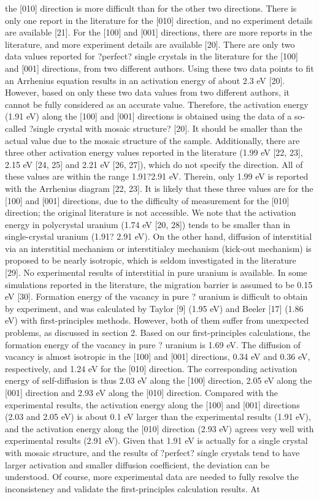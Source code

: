 \documentclass[review]{elsarticle}
\begin{document}
the [010] direction is more difficult than for the other two directions. There is only one report in the literature for the [010] direction, and no experiment details are available [21]. For the [100] and [001] directions, there are more reports in the literature, and more experiment details are available [20]. There are only two data values reported for ?perfect? single crystals in the literature for the [100] and [001] directions, from two different authors. Using these two data points to fit an Arrhenius equation results in an activation energy of about 2.3 eV [20]. However, based on only these two data values from two different authors, it cannot be fully considered as an accurate value. Therefore, the activation energy (1.91 eV) along the [100] and [001] directions is obtained using the data of a so-called ?single crystal with mosaic structure? [20]. It should be smaller than the actual value due to the mosaic structure of the sample. Additionally, there are three other activation energy values reported in the literature (1.99 eV [22, 23], 2.15 eV [24, 25] and 2.21 eV [26, 27]), which do not specify the direction. All of these values are within the range 1.91?2.91 eV. Therein, only 1.99 eV is reported with the Arrhenius diagram [22, 23].  It is likely that these three values are for the [100] and [001] directions, due to the difficulty of measurement for the [010] direction; the original literature is not accessible. We note that the activation energy in polycrystal uranium (1.74 eV [20, 28]) tends to be smaller than in single-crystal uranium (1.91? 2.91 eV). On the other hand, diffusion of interstitial via an interstitial mechanism or interstitialcy mechanism (kick-out mechanism) is proposed to be nearly isotropic, which is seldom investigated in the literature [29].  No experimental results of interstitial in pure uranium is available. In some simulations reported in the literature, the migration barrier is assumed to be 0.15 eV [30]. Formation energy of the vacancy in pure ? uranium is difficult to obtain by experiment, and was calculated by Taylor [9] (1.95 eV) and Beeler [17] (1.86 eV) with first-principles methods. However, both of them suffer from unexpected problems, as discussed in section 2.  Based on our first-principles calculations, the formation energy of the vacancy in pure ? uranium is 1.69 eV. The diffusion of vacancy is almost isotropic in the [100] and [001] directions, 0.34 eV and 0.36 eV, respectively, and 1.24 eV for the [010] direction. The corresponding activation energy of self-diffusion is thus 2.03 eV along the [100] direction, 2.05 eV along the [001] direction and 2.93 eV along the [010] direction.  Compared with the experimental results, the activation energy along the [100] and [001] directions (2.03 and 2.05 eV) is about 0.1 eV larger than the experimental results (1.91 eV), and the activation energy along the [010] direction (2.93 eV) agrees very well with experimental results (2.91 eV). Given that 1.91 eV is actually for a single crystal with mosaic structure, and the results of ?perfect? single crystals tend to have larger activation and smaller diffusion coefficient, the deviation can be understood. Of course, more experimental data are needed to fully resolve the inconsistency and validate the first-principles calculation results.  At 
\end{document}
